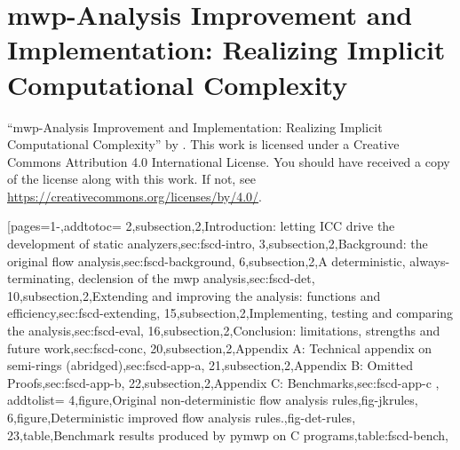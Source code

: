 \section{mwp-Analysis Improvement and Implementation: Realizing Implicit Computational Complexity}\label{sec:fscd}
\pageIconAnalysis
{}
{\par\enquote{mwp-Analysis Improvement and Implementation: Realizing Implicit Computational Complexity} \textcopyright{ }by{ }\CTNT.
\newline{}This work is licensed under a Creative Commons Attribution 4.0 International License.
\newline{}You should have received a copy of the license along with this work. %
\newline{}If not, see \url{https://creativecommons.org/licenses/by/4.0/}.}
[pages={1-},addtotoc={
 2,subsection,2,{Introduction: letting ICC drive the development of static analyzers},sec:fscd-intro,
 3,subsection,2,{Background: the original flow analysis},sec:fscd-background,
 6,subsection,2,{A deterministic, always-terminating, declension of the mwp analysis},sec:fscd-det,
10,subsection,2,{Extending and improving the analysis: functions and efficiency},sec:fscd-extending,
15,subsection,2,{Implementing, testing and comparing the analysis},sec:fscd-eval,
16,subsection,2,{Conclusion: limitations, strengths and future work},sec:fscd-conc,
20,subsection,2,{Appendix A: Technical appendix on semi-rings (abridged)},sec:fscd-app-a,
21,subsection,2,{Appendix B: Omitted Proofs},sec:fscd-app-b,
22,subsection,2,{Appendix C: Benchmarks},sec:fscd-app-c
}, addtolist={
4,figure,{Original non-deterministic flow analysis rules},fig-jkrules,
6,figure,{Deterministic improved flow analysis rules.},fig-det-rules,
23,table,{Benchmark results produced by pymwp on C programs},table:fscd-bench},
